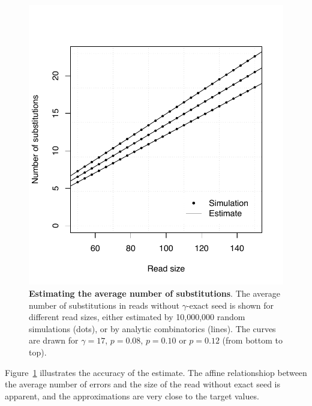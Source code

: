\documentclass{article}
\begin{document}
\begin{figure}[h]
\centering
\includegraphics[scale=0.445]{simulp-average.pdf}
\caption{\textbf{Estimating the average number of substitutions}. The
average number of substitutions in reads without $\gamma$-exact seed is
shown for different read sizes, either estimated by 10,000,000 random
simulations (dots), or by analytic combinatorics (lines). The curves are
drawn for $\gamma=17$, $p=0.08$, $p=0.10$ or $p=0.12$ (from bottom to
top).}
\label{fig:simulavsub}
\end{figure}

Figure~\ref{fig:simulavsub} illustrates the accuracy of the estimate. The
affine relationshiop between the average number of errors and the size of
the read without exact seed is apparent, and the approximations are very
close to the target values.
\end{document}
